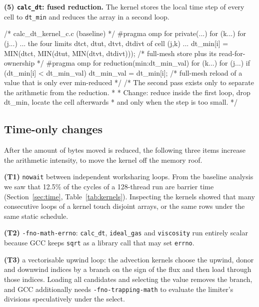 \documentclass[a4paper,11pt]{article}
\newcommand{\kernel}[1]{\texttt{#1}}
\begin{document}
\textbf{(5) \kernel{calc\_dt}: fused reduction.}
The kernel stores the local time step of every cell to \texttt{dt\_min} and reduces the array in a second loop.
\begin{code}
/* calc_dt_kernel_c.c (baseline) */
#pragma omp for private(...)
for (k...) for (j...) {
    ... the four limits dtct, dtut, dtvt, dtdivt of cell (j,k) ...
    dt_min[i] = MIN(dtct, MIN(dtut, MIN(dtvt, dtdivt)));  /* full-mesh store plus its
                                                              read-for-ownership */
}
#pragma omp for reduction(min:dt_min_val)
for (k...) for (j...)
    if (dt_min[i] < dt_min_val) dt_min_val = dt_min[i];    /* full-mesh reload of a value that
                                                              is only ever min-reduced */
/* The second pass exists only to separate the arithmetic from the reduction.
 *
 * Change: reduce inside the first loop, drop dt_min, locate the cell afterwards
 * and only when the step is too small. */
\end{code}

\subsection{Time-only changes}
\label{sec:timeonly}
After the amount of bytes moved is reduced, the following three items increase the arithmetic intensity, to move the kernel off the memory roof.

\textbf{(T1)} \texttt{nowait} between independent worksharing loops. From the baseline analysis we saw that 12.5\% of the cycles of a 128-thread run are barrier time (Section~\ref{sec:time}, Table~\ref{tab:kernels}). Inspecting the kernels showed that many consecutive loops of a kernel touch disjoint arrays, or the same rows under the same static schedule.

\textbf{(T2)} \texttt{-fno-math-errno}: \kernel{calc\_dt}, \kernel{ideal\_gas} and \kernel{viscosity} run entirely scalar because GCC keeps \texttt{sqrt} as a library call that may set \texttt{errno}.

\textbf{(T3)} a vectorisable upwind loop: the advection kernels choose the upwind, donor and downwind
indices by a branch on the sign of the flux and then load through those indices.
Loading all candidates and selecting the value removes the branch, and GCC additionally needs \texttt{-fno-trapping-math} to evaluate the limiter's divisions speculatively under the select.
\end{document}

